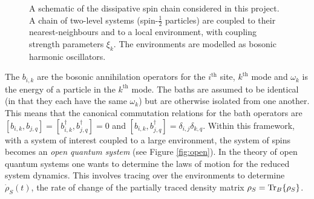 \documentclass[11pt,a4paper,article,oneside]{memoir}
\begin{document}
\begin{figure}[t]
  \begin{center}
    \caption{A schematic of the dissipative spin chain considered in
      this project. A chain of two-level systems (spin-$\frac{1}{2}$
      particles) are coupled to their nearest-neighbours and to a
      local environment, with coupling strength parameters
      $\xi_k$. The environments are modelled as bosonic harmonic
      oscillators.}
    \label{fig:dissspinchain}
  \end{center}
\end{figure}The $b_{i,k}$ are the bosonic annihilation operators for the
$i^\text{th}$ site, $k^\text{th}$ mode and $\omega_k$ is the energy of
a particle in the $k^\text{th}$ mode. The baths are assumed to be
identical (in that they each have the same $\omega_{k}$) but are
otherwise isolated from one another. This means that the canonical
commutation relations for the bath operators are
$[b_{i,k},b_{j,q}]=[b^\dagger_{i,k},b^\dagger_{j,q}]=0$ and
$[b_{i,k},b^\dagger_{j,q}]=\delta_{i,j}\delta_{k,q}$. Within this
framework, with a system of interest coupled to a large environment,
the system of spins becomes an \textit{open quantum system} (see
Figure \ref{fig:open}). In the theory of open quantum systems
\cite{Breuer2002} one wants to determine the laws of motion for the
reduced system dynamics. This involves tracing over the environments
to determine $\dot{\rho}_S(t)$, the rate of change of the partially
traced density matrix $\rho_S=\operatorname{Tr}_B\{\rho_S\}$.
\end{document}
